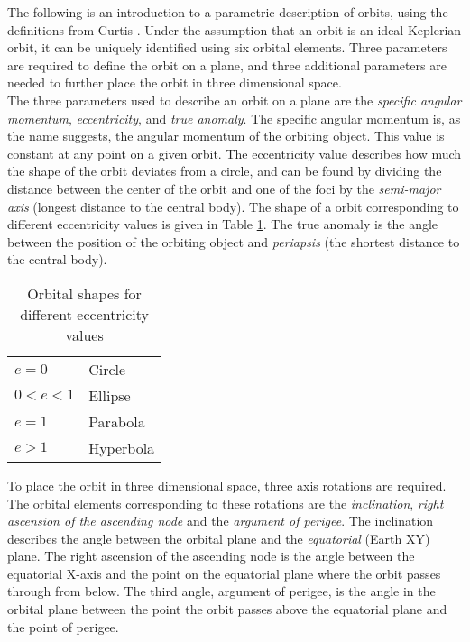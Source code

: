 The following is an introduction to a parametric description of orbits, using the definitions from Curtis \cite{Curtis2009}. Under the assumption that an orbit is an ideal Keplerian orbit, it can be uniquely identified using six orbital elements. Three parameters are required to define the orbit on a plane, and three additional parameters are needed to further place the orbit in three dimensional space. \\

The three parameters used to describe an orbit on a plane are the \textit{specific angular momentum}, \textit{eccentricity}, and \textit{true anomaly}. The specific angular momentum is, as the name suggests, the angular momentum of the orbiting object. This value is constant at any point on a given orbit. The eccentricity value describes how much the shape of the orbit deviates from a circle, and can be found by dividing the distance between the center of the orbit and one of the foci by the \textit{semi-major axis} (longest distance to the central body). The shape of a orbit corresponding to different eccentricity values is given in Table \ref{table:eccentricity}. The true anomaly is the angle between the position of the orbiting object and \textit{periapsis} (the shortest distance to the central body). \\

\begin{table}[h]
\centering
\begin{tabular}{@{}ll@{}}
\toprule
$e = 0$      & Circle    \\
$0 < e < 1 $ & Ellipse   \\
$e = 1$      & Parabola  \\
$e > 1 $     & Hyperbola \\
\bottomrule
\end{tabular}
\caption{Orbital shapes for different eccentricity values}
\label{table:eccentricity}
\end{table}


To place the orbit in three dimensional space, three axis rotations are required. The orbital elements corresponding to these rotations are the \textit{inclination}, \textit{right ascension of the ascending node} and the \textit{argument of perigee}. The inclination describes the angle between the orbital plane and the \textit{equatorial} (Earth XY) plane. The right ascension of the ascending node is the angle between the equatorial X-axis and the point on the equatorial plane where the orbit passes through from below. The third angle, argument of perigee, is the angle in the orbital plane between the point the orbit passes above the equatorial plane and the point of perigee. \\


